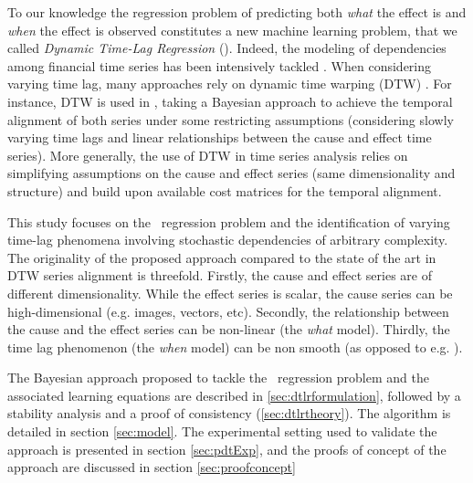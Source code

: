 To our knowledge the regression problem of predicting both {\em what} the effect is and {\em when} 
the effect is observed constitutes a new machine learning problem, that we called 
{\em Dynamic Time-Lag Regression} (\XX). Indeed, the modeling of dependencies among financial time 
series has been intensively tackled \citep{ZHOU2006195}. When considering varying time lag, many 
approaches rely on dynamic time warping (DTW) \citep{SakoeShiba1978}. For instance, DTW is used in 
\citet{SignalDiffusion}, taking a Bayesian approach to achieve the temporal alignment of both 
series under some restricting assumptions (considering slowly varying time lags and linear 
relationships between the cause and effect time series). More generally, the use of DTW in time 
series analysis relies on simplifying assumptions on the cause and effect series 
(same dimensionality and structure) and build upon available cost matrices for the temporal 
alignment. 

This study focuses on the \XX\ regression problem and the identification of varying time-lag 
phenomena involving stochastic dependencies of arbitrary complexity. The originality of the 
proposed approach compared to the state of the art in DTW series alignment is threefold. Firstly, 
the cause and effect series are of different dimensionality. While the effect series is scalar, the 
cause series can be high-dimensional (e.g. images, vectors, etc). Secondly, the relationship 
between the cause and the effect series can be non-linear (the {\em what} model). Thirdly, the time 
lag phenomenon (the {\em when} model) can be non smooth (as opposed to e.g. \citet{ZHOU2006195}).

The Bayesian approach proposed to tackle the \XX\ regression problem and the associated learning 
equations are described in \cref{sec:dtlrformulation}, followed by a stability analysis and 
a proof of consistency (\cref{sec:dtlrtheory}). The algorithm is detailed in section 
\ref{sec:model}. The experimental setting used to validate the approach is presented in section 
\ref{sec:pdtExp}, and the proofs of concept of the approach are discussed in section 
\ref{sec:proofconcept}

